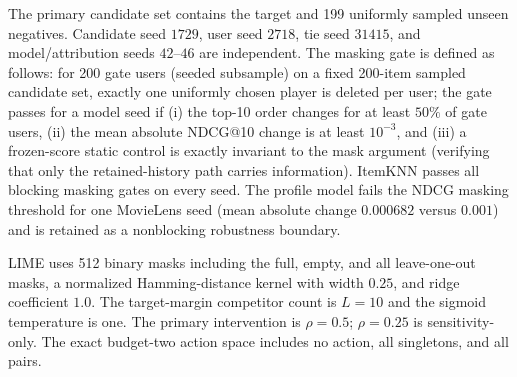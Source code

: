 \documentclass[a4paper,fleqn,doubleblind]{cas-sc}
\begin{document}
The primary candidate set contains the target and 199 uniformly sampled unseen negatives. Candidate seed $1729$, user seed $2718$, tie seed $31415$, and model/attribution seeds $42$--$46$ are independent. The masking gate is defined as follows: for 200 gate users (seeded subsample) on a fixed 200-item sampled candidate set, exactly one uniformly chosen player is deleted per user; the gate passes for a model seed if (i) the top-10 order changes for at least $50\%$ of gate users, (ii) the mean absolute NDCG@10 change is at least $10^{-3}$, and (iii) a frozen-score static control is exactly invariant to the mask argument (verifying that only the retained-history path carries information). ItemKNN passes all blocking masking gates on every seed. The profile model fails the NDCG masking threshold for one MovieLens seed (mean absolute change $0.000682$ versus $0.001$) and is retained as a nonblocking robustness boundary.

LIME uses 512 binary masks including the full, empty, and all leave-one-out masks, a normalized Hamming-distance kernel with width $0.25$, and ridge coefficient $1.0$. The target-margin competitor count is $L=10$ and the sigmoid temperature is one. The primary intervention is $\rho=0.5$; $\rho=0.25$ is sensitivity-only. The exact budget-two action space includes no action, all singletons, and all pairs.
\end{document}

